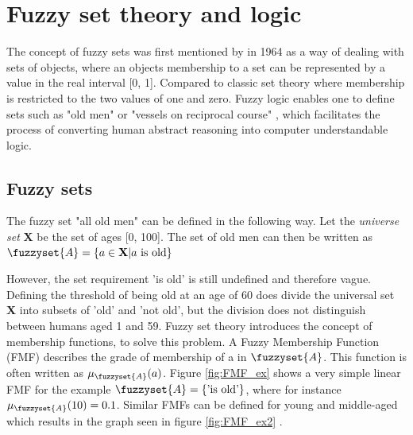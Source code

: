 
\chapter{Fuzzy set theory and logic}
The concept of fuzzy sets was first mentioned by \textcite{zadeh1996fuzzy} in 1964 as a way of dealing with sets of objects, where an objects membership to a set can be represented by a value in the real interval [0, 1]. Compared to classic set theory where  membership is restricted to the two values of one and zero. Fuzzy logic enables one to define sets such as "old men" or "vessels on reciprocal course" \cite{zadeh1996fuzzy}, which facilitates the process of converting human abstract reasoning into computer understandable logic.
\section{Fuzzy sets}
The fuzzy set "all old men" can be defined in the following way. Let the \textit{universe set} \textbf{X} be the set of ages [0, 100]. The set of old men can then be written as
$\fuzzyset{A}=\left \{ a \in \textbf{X} | a \text{ is old} \right \}$
\cite{chen2000introduction}

However, the set requirement 'is old' is still undefined and therefore vague. Defining the threshold of being old at an age of 60 does divide the universal set \textbf{X} into subsets of 'old' and 'not old', but the division does not distinguish between humans aged 1 and 59.
Fuzzy set theory introduces the concept of membership functions, to solve this problem. A Fuzzy Membership Function (FMF) describes the grade of membership of a  in  $\fuzzyset{A}$. This function is often written as $\mu_{\fuzzyset{A}}(a)$. Figure \ref{fig:FMF_ex} shows a very simple linear FMF for the example $\fuzzyset{A}=\left \{\text{'is old'} \right \}$, where for instance $\mu_{\fuzzyset{A}}(10)=0.1$. Similar FMFs can be defined for young and middle-aged which results in the graph seen in figure \ref{fig:FMF_ex2} \cite{ross2009fuzzy}.

